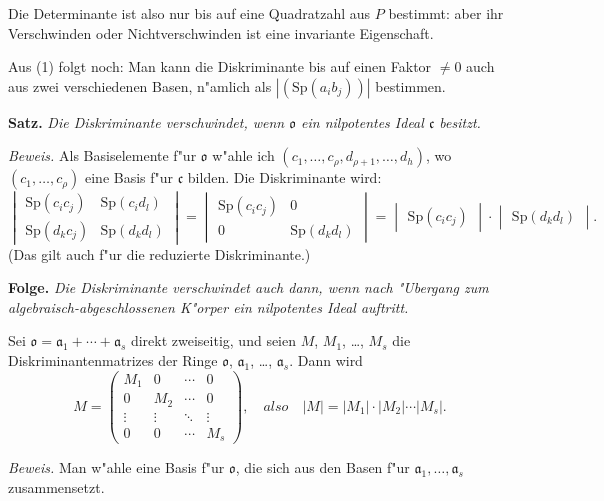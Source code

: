 \documentclass[12pt,a4paper]{article}
\theoremstyle{plain}
\newcommand{\Sp}{\mathrm{Sp}}
\begin{document}
Die Determinante ist also nur bis auf eine Quadratzahl aus $P$ bestimmt: aber ihr Verschwinden oder Nichtverschwinden ist eine invariante Eigenschaft.

Aus (1) folgt noch: Man kann die Diskriminante bis auf einen Faktor $\neq 0$ auch aus zwei verschiedenen Basen, n"amlich als $|(\Sp(a_i b_j))|$ bestimmen.

\medskip\noindent\textbf{Satz.}
\textit{Die Diskriminante verschwindet, wenn $\mathfrak{o}$ ein nilpotentes Ideal $\mathfrak{c}$ besitzt.}

\noindent\textit{Beweis.}
Als Basiselemente f"ur $\mathfrak{o}$ w"ahle ich $(c_1,\ldots,c_\rho,d_{\rho+1},\ldots,d_h)$, wo $(c_1,\ldots,c_\rho)$ eine Basis f"ur $\mathfrak{c}$ bilden. Die Diskriminante wird:
\[
\begin{vmatrix}
\Sp(c_i c_j) & \Sp(c_i d_l) \\
\Sp(d_k c_j) & \Sp(d_k d_l)
\end{vmatrix}
=
\begin{vmatrix}
\Sp(c_i c_j) & 0 \\
0 & \Sp(d_k d_l)
\end{vmatrix}
=
\begin{vmatrix} \Sp(c_i c_j) \end{vmatrix} \cdot \begin{vmatrix} \Sp(d_k d_l) \end{vmatrix}.
\]
(Das gilt auch f"ur die reduzierte Diskriminante.)

\medskip\noindent\textbf{Folge.}
\textit{Die Diskriminante verschwindet auch dann, wenn nach "Ubergang zum algebraisch-abgeschlossenen K"orper ein nilpotentes Ideal auftritt.}

Sei $\mathfrak{o} = \mathfrak{a}_1 + \cdots + \mathfrak{a}_s$ direkt zweiseitig, und seien $M$, $M_1$, \ldots, $M_s$ die Diskriminantenmatrizes der Ringe $\mathfrak{o}$, $\mathfrak{a}_1$, \ldots, $\mathfrak{a}_s$. Dann wird
\[
M = \begin{pmatrix}
M_1 & 0 & \cdots & 0 \\
0 & M_2 & \cdots & 0 \\
\vdots & \vdots & \ddots & \vdots \\
0 & 0 & \cdots & M_s
\end{pmatrix},
\quad{also}\quad
|M| = |M_1| \cdot |M_2| \cdots |M_s|.
\]

\noindent\textit{Beweis.}
Man w"ahle eine Basis f"ur $\mathfrak{o}$, die sich aus den Basen f"ur $\mathfrak{a}_1,\ldots,\mathfrak{a}_s$ zusammensetzt.
\end{document}
